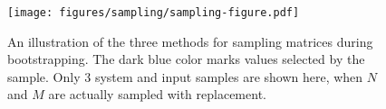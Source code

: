 \begin{figure}
    \centering
    \texttt{[image: figures/sampling/sampling-figure.pdf]}
    \caption{An illustration of the three methods for sampling matrices during bootstrapping.
    The dark blue color marks values selected by the sample.
    Only 3 system and input samples are shown here, when $N$ and $M$ are actually sampled with replacement.
    }
    \label{fig:sampling}
\end{figure}